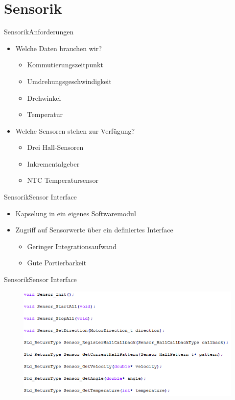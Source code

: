\section{Sensorik}

\begin{frame}{Sensorik}{Anforderungen}
  \begin{itemize}
    \item Welche Daten brauchen wir?
    \begin{itemize}
    \item Kommutierungszeitpunkt
    \item Umdrehungsgeschwindigkeit
    \item Drehwinkel
    \item Temperatur
    \end{itemize}
    \item Welche Sensoren stehen zur Verfügung?
    \begin{itemize}
      \item Drei Hall-Sensoren
      \item Inkrementalgeber
      \item NTC Temperatursensor
    \end{itemize}
  \end{itemize}
\end{frame}

\begin{frame}{Sensorik}{Sensor Interface}	
  \begin{itemize}
    \item Kapselung in ein eigenes Softwaremodul
    \item Zugriff auf Sensorwerte über ein definiertes Interface
    \begin{itemize}
      \item Geringer Integrationsaufwand
      \item Gute Portierbarkeit
    \end{itemize}
  \end{itemize}
\end{frame}

\begin{frame}{Sensorik}{Sensor Interface}	
 \begin{figure} [htbp]
  \centering
  \includegraphics[scale=0.6]{Sensor/sensor_interface.PNG}
 \end{figure}
\end{frame}

